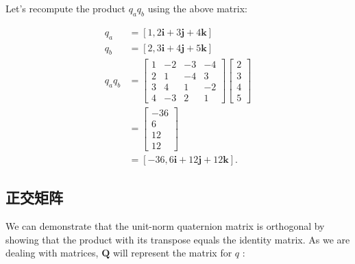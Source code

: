 Let's recompute the product $q_{a} q_{b}$ using the above matrix:

$$
\begin{aligned}
q_{a} & =[1,2 \mathbf{i}+3 \mathbf{j}+4 \mathbf{k}] \\
q_{b} & =[2,3 \mathbf{i}+4 \mathbf{j}+5 \mathbf{k}] \\
q_{a} q_{b} & =\left[\begin{array}{cccc}
1 & -2 & -3 & -4 \\
2 & 1 & -4 & 3 \\
3 & 4 & 1 & -2 \\
4 & -3 & 2 & 1
\end{array}\right]\left[\begin{array}{l}
2 \\
3 \\
4 \\
5
\end{array}\right] \\
& =\left[\begin{array}{c}
-36 \\
6 \\
12 \\
12
\end{array}\right] \\
& =[-36,6 \mathbf{i}+12 \mathbf{j}+12 \mathbf{k}] .
\end{aligned}
$$

\subsection{正交矩阵}
We can demonstrate that the unit-norm quaternion matrix is orthogonal by showing that the product with its transpose equals the identity matrix. As we are dealing with matrices, $\mathbf{Q}$ will represent the matrix for $q$ :

